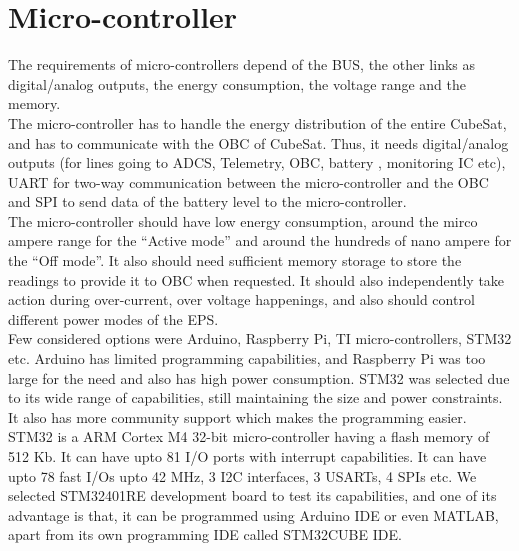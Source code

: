  \section{Micro-controller}
 The requirements of micro-controllers depend of the BUS, the other links as digital/analog outputs, the energy consumption, the voltage range and the memory.
 \\
 The micro-controller has to handle the energy distribution of the entire CubeSat, and has to communicate with the OBC of CubeSat. Thus, it needs digital/analog outputs (for lines going to ADCS, Telemetry, OBC, battery , monitoring IC etc), UART for two-way communication between the micro-controller and the OBC and SPI to  send data of the battery level to the micro-controller.
 \\
 The micro-controller should have low energy consumption, around the mirco ampere range for the “Active mode” and around the hundreds of nano ampere for the “Off mode”. It also should need sufficient memory storage to store the readings to provide it to OBC when requested. It should also independently take action during over-current, over voltage happenings, and also should control different power modes of the EPS.
 \\
 Few considered options were Arduino, Raspberry Pi, TI micro-controllers, STM32 etc. Arduino has limited programming capabilities, and Raspberry Pi was too large for the need and also has high power consumption. STM32 was selected due to its wide range of capabilities, still maintaining the size and power constraints. It also has more community support which makes the programming easier.
 \\
 STM32 is a ARM Cortex M4 32-bit micro-controller having a flash memory of 512 Kb. It can have upto 81 I/O ports with interrupt capabilities. It can have upto 78 fast I/Os upto 42 MHz, 3 I2C interfaces, 3 USARTs, 4 SPIs etc. We selected STM32401RE development board to test its capabilities, and one of its advantage is that, it can be programmed using Arduino IDE or even MATLAB, apart from its own programming IDE called STM32CUBE IDE.